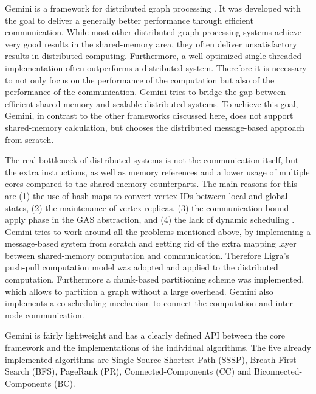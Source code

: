 
Gemini is a framework for distributed graph processing \cite{Gemini}.
It was developed with the goal to deliver a generally better performance through efficient communication.
While most other distributed graph processing systems achieve very good results in the shared-memory area, they often deliver unsatisfactory results in distributed computing.
Furthermore, a well optimized single-threaded implementation often outperforms a distributed system.
Therefore it is necessary to not only focus on the performance of the computation but also of the performance of the communication.
Gemini tries to bridge the gap between efficient shared-memory and scalable distributed systems.
To achieve this goal, Gemini, in contrast to the other frameworks discussed here, does not support shared-memory calculation, but chooses the distributed message-based approach from scratch.

The real bottleneck of distributed systems is not the communication itself, but the extra instructions, as well as memory references and a lower usage of multiple cores compared to the shared memory counterparts.
The main reasons for this are (1) the use of hash maps to convert vertex IDs between local and global states, (2) the maintenance of vertex replicas, (3) the communication-bound apply phase in the GAS abstraction, and (4) the lack of dynamic scheduling \cite{Gemini}.
Gemini tries to work around all the problems mentioned above, by implemening a message-based system from scratch and getting rid of the extra mapping layer between shared-memory computation and communication.
Therefore Ligra's push-pull computation model was adopted and applied to the distributed computation.
Furthermore a chunk-based partitioning scheme was implemented, which allows to partition a graph without a large overhead.
Gemini also implements a co-scheduling mechanism to connect the computation and inter-node communication.

Gemini is fairly lightweight and has a clearly defined API between the core framework and the implementations of the individual algorithms. The five already implemented algorithms are Single-Source Shortest-Path (SSSP), Breath-First Search (BFS), PageRank (PR), Connected-Components (CC) and Biconnected-Components (BC).

